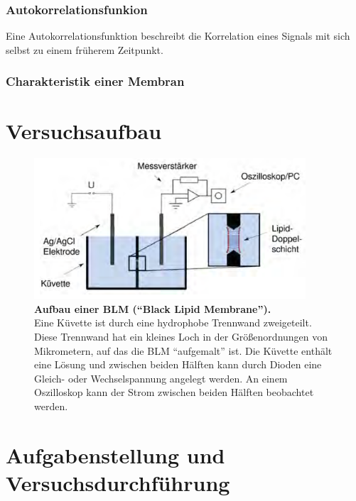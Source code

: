 \documentclass[a4paper,ngerman]{scrartcl}
\begin{document}
\subsubsection{Autokorrelationsfunkion}

Eine Autokorrelationsfunktion beschreibt die Korrelation eines Signals mit sich selbst zu einem früherem Zeitpunkt. 





\subsubsection{Charakteristik einer Membran}






\section{Versuchsaufbau}

\begin{figure}[tb!]
  \centering
  \includegraphics[width=0.9\textwidth]{abbildungen/blmaufbau.png}
  \caption{\textbf{Aufbau einer BLM ("`Black Lipid Membrane"').} \\Eine Küvette ist durch eine hydrophobe Trennwand zweigeteilt. Diese Trennwand hat ein kleines Loch in der Größenordnungen von Mikrometern, auf das die BLM "`aufgemalt"' ist. Die Küvette enthält eine Lösung und zwischen beiden Hälften kann durch Dioden eine Gleich- oder Wechselspannung angelegt werden. An einem Oszilloskop kann der Strom zwischen beiden Hälften beobachtet werden.}
  \label{fig:blmaufbau}
\end{figure}






\section{Aufgabenstellung und Versuchsdurchführung}
\end{document}
